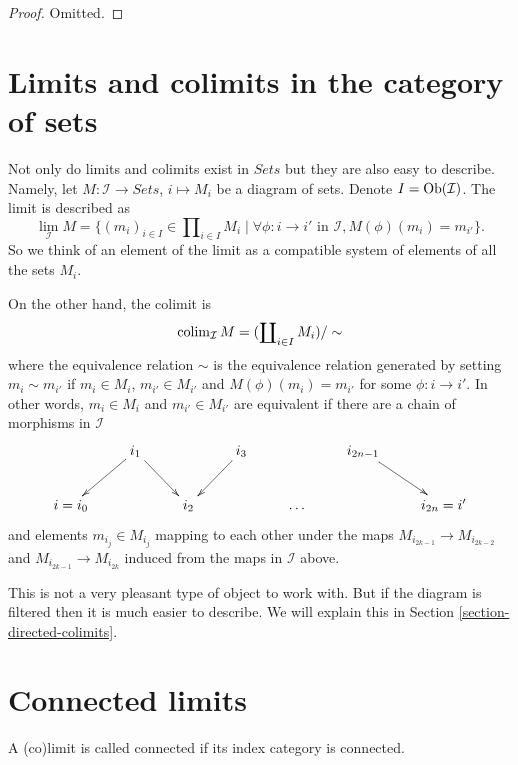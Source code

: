 \begin{proof}
Omitted.
\end{proof}







\section{Limits and colimits in the category of sets}
\label{section-limit-sets}

\noindent
Not only do limits and colimits exist in $\textit{Sets}$
but they are also easy to describe. Namely, let $M : \mathcal{I}
\to \textit{Sets}$, $i \mapsto M_i$ be a diagram of sets.
Denote $I = \mathop{\mathrm{Ob}}\nolimits(\mathcal{I})$.
The limit is described as
$$
\lim_\mathcal{I} M
=
\{
(m_i)_{i\in I} \in \prod\nolimits_{i\in I} M_i
\mid
\forall \phi : i \to i' \text{ in }\mathcal{I},
M(\phi)(m_i) = m_{i'}
\}.
$$
So we think of an element of the limit as a compatible system of elements
of all the sets $M_i$.

\medskip\noindent
On the other hand, the colimit is
$$
\mathop{\mathrm{colim}}\nolimits_\mathcal{I} M
=
(\coprod\nolimits_{i\in I} M_i)/\sim
$$
where the equivalence relation $\sim$ is the equivalence relation
generated by setting $m_i \sim m_{i'}$ if $m_i \in M_i$,
$m_{i'} \in M_{i'}$ and $M(\phi)(m_i) = m_{i'}$ for some
$\phi : i \to i'$. In other words, $m_i \in M_i$
and $m_{i'} \in M_{i'}$ are equivalent if there are a
chain of morphisms in $\mathcal{I}$
$$
\xymatrix{
&
i_1 \ar[ld] \ar[rd] & &
i_3 \ar[ld] & &
i_{2n-1} \ar[rd] & \\
i = i_0 & &
i_2 & &
\ldots & &
i_{2n} = i'
}
$$
and elements $m_{i_j} \in M_{i_j}$ mapping to each other under
the maps $M_{i_{2k-1}} \to M_{i_{2k-2}}$ and $M_{i_{2k-1}}
\to M_{i_{2k}}$ induced from the maps in $\mathcal{I}$ above.

\medskip\noindent
This is not a very pleasant type of object to work with.
But if the diagram is filtered then it is much easier to
describe. We will explain this in Section \ref{section-directed-colimits}.



\section{Connected limits}
\label{section-connected-limits}

\noindent
A (co)limit is called connected if its index category is connected.

